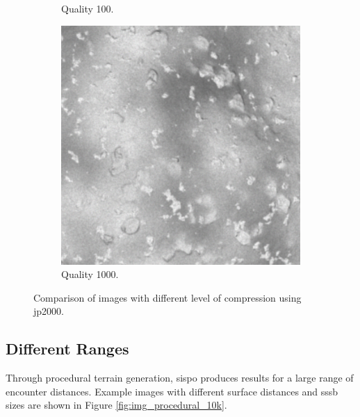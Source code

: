 \begin{figure}[htb]
\begin{center}
\begin{subfigure}[b]{0.47\textwidth}
\begin{center}
            \end{center}
            \caption{Quality 100.}
            \label{fig:img_quality_100}
        \end{subfigure}
        \begin{subfigure}[b]{0.47\textwidth}
            \begin{center}
                \includegraphics[width=\textwidth]{doc/thesis/0_figures/quality_compare/jp2_1000_center.png}
            \end{center}
            \caption{Quality 1000.}
            \label{fig:img_quality_1000}
        \end{subfigure}
    \end{center}
    \caption{Comparison of images with different level of compression using jp2000.}
    \label{fig:img_quality_comp}
\end{figure}

\subsection{Different Ranges}
Through procedural terrain generation, \gls{sispo} produces results for a large range of encounter distances. Example images with different surface distances and \gls{sssb} sizes are shown in Figure \ref{fig:img_procedural_10k}.

